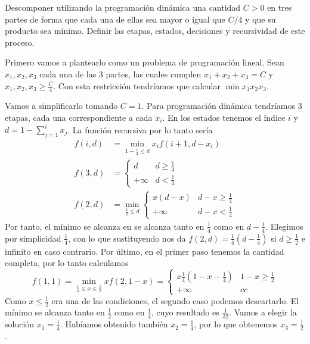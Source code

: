 \documentclass[twoside]{article}
\begin{document}
\newpage 
\begin{ejercicio}{6}\label{6}
Descomponer utilizando la programación dinámica una cantidad $C > 0$ en tres partes de forma
que cada una de ellas sea mayor o igual que $C/4$ y que su producto sea mínimo. Definir las etapas,
estados, decisiones y recursividad de este proceso.
\end{ejercicio}
\begin{solucion}
Primero vamos a plantearlo como un problema de programación lineal. Sean $x_1,x_2,x_3$ cada una de las 3 partes, las cuales cumplen $x_1+x_2+x_3=C$ y $x_1,x_2,x_3\geq\frac{C}{4}$. Con esta restricción tendríamos que calcular $\min x_1x_2x_3$. 

Vamos a simplificarlo tomando $C=1$. Para programación dinámica tendríamos 3 etapas, cada una correspondiente a cada $x_i$. En los estados tenemos el índice $i$ y $d=1-\sum_{j=1}^ix_j$. La función recursiva por lo tanto sería
\begin{align*}
f(i,d)&=\min_{1-\frac{i}{4}\leq d} x_if(i+1,d-x_i) \\
f(3,d)&=\begin{cases}
d & d\geq\frac{1}{4}\\
+\infty & d<\frac{1}{4}
\end{cases}\\
f(2,d)&=\min_{\frac{1}{2}\leq d}\begin{cases}
x(d-x) & d-x\geq\frac{1}{4}\\
+\infty & d-x <\frac{1}{4}
\end{cases}
\end{align*}
Por tanto, el mínimo se alcanza en  se alcanza tanto en $\frac{1}{4}$ como en $d-\frac{1}{4}$. Elegimos por simplicidad $\frac{1}{4}$, con lo que sustituyendo nos da $f(2,d)=\frac{1}{4}(d-\frac{1}{4})$ si $d\geq\frac{1}{2}$ e infinito en caso contrario. Por último, en el primer paso tenemos la cantidad completa, por lo tanto calculamos
$$f(1,1)=\min_{\frac{1}{4}\leq x\leq\frac{1}{2}}xf(2,1-x)=\begin{cases}
x\frac{1}{4}(1-x-\frac{1}{4}) & 1-x\geq\frac{1}{2}\\
+\infty & cc
\end{cases}$$
Como $x\leq\frac{1}{2}$ era una de las condiciones, el segundo caso podemos descartarlo. El mínimo se alcanza tanto en $\frac{1}{2}$ como en $\frac{1}{4}$, cuyo resultado es $\frac{1}{32}$. Vamos a elegir la solución $x_1=\frac{1}{4}$. Habíamos obtenido también $x_2=\frac{1}{4}$, por lo que obtenemos $x_3=\frac{1}{2}$.
\end{solucion}
\end{document}

